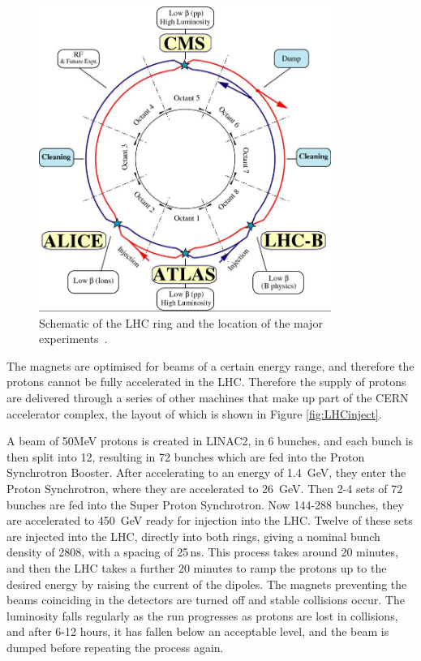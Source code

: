 \begin{figure}[htbp]
\centering
\includegraphics[width=0.85\textwidth]{Figures/Detector/lhc-schematic}
\caption{Schematic of the LHC ring and the location of the major experiments~\cite{LHCConcept}.}
\label{fig:LHC}
\end{figure}


The magnets are optimised for beams of a certain energy range, and therefore the protons cannot be fully accelerated in the LHC. Therefore the supply of protons are delivered through a series of other machines that make up part of the CERN accelerator complex, the layout of which is shown in Figure \ref{fig:LHCinject}. 

A beam of 50MeV protons is created in LINAC2, in 6 bunches, and each bunch is then split into 12, resulting in 72 bunches which are fed into the Proton Synchrotron Booster. After accelerating to an energy of 1.4~GeV, they enter the Proton Synchrotron, where they are accelerated to 26~GeV. Then 2-4 sets of 72 bunches are fed into the Super Proton Synchrotron. Now 144-288 bunches, they are accelerated to 450~GeV ready for injection into the LHC. Twelve of these sets are injected into the LHC, directly into both rings, giving a nominal bunch density of 2808, with a spacing of 25\,ns. This process takes around 20 minutes, and then the LHC takes a further 20 minutes to ramp the protons up to the desired energy by raising the current of the dipoles. The magnets preventing the beams coinciding in the detectors are turned off and stable collisions occur. The luminosity falls regularly as the run progresses as protons are lost in collisions, and after 6-12 hours, it has fallen below an acceptable level, and the beam is dumped before repeating the process again. 


